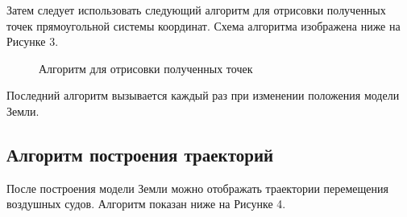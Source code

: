 \documentclass[14pt, a4paper]{extarticle}
\begin{document}
	
	Затем следует использовать следующий алгоритм для отрисовки полученных точек прямоугольной системы
	координат. Схема алгоритма изображена ниже на Рисунке 3.
	
	\begin{figure}[h!]
		\caption{Алгоритм для отрисовки полученных точек}
	\end{figure}		
	Последний алгоритм вызывается каждый раз при изменении положения модели Земли.	
	\clearpage	
	
	
	\subsection{Алгоритм построения траекторий}
	После построения модели Земли можно отображать траектории перемещения воздушных судов. Алгоритм показан ниже на Рисунке 4.
	 
\end{document}

